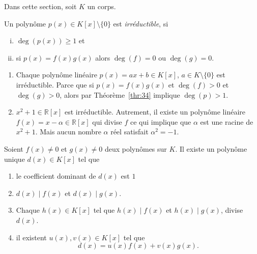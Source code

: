 Dans cette section, soit $K$ un corps.

\begin{definition}
  \label{def:53}
  Un polynôme $p(x) ∈ K[x] \setminus \{0\}$ est \emph{irréductible}, si
  \begin{enumerate}[i)]
  \item $\deg(p(x)) ≥1$ et
  \item  si $p(x) = f(x) g(x)$ alors $\deg(f) = 0$ ou $\deg(g) = 0$. 
  \end{enumerate}
\end{definition}

\begin{example}
  \label{exe:46}
  \begin{enumerate}
  \item   Chaque polynôme linéaire $p(x) = ax + b ∈ K[x]$, $a ∈ K \setminus\{0\}$ est irréductible. Parce que si $p(x) = f(x) g(x)$ et $\deg(f)>0$ et $\deg(g)>0$, alors par Théorème~\ref{thr:34} implique $\deg(p) >1$.
  \item $x^2 +1 ∈ℝ[x]$ est irréductible. Autrement, il existe un polynôme linéaire $f(x) =  x - α ∈ ℝ[x]$ qui divise $f$ ce qui implique que $α$ est une racine de $x^2 +1$. Mais aucun nombre $α$ réel satisfait $α^2 = -1$.
  \end{enumerate}
\end{example}

\begin{theorem}
  Soient $f(x) ≠0$ et $g(x)≠0$ deux polynômes sur $K$. Il existe un polynôme unique $d(x)∈K[x]$ tel que
  \begin{enumerate}
  \item le coefficient dominant de $d(x)$ est $1$
  \item $d(x) \mid f(x)$ et $d(x) \mid g(x)$.
  \item Chaque $h(x) ∈ K[x]$ tel que $h(x) \mid f(x)$  et $h(x) \mid g(x)$, divise $d(x)$.
  \item il existent $u(x), v(x) ∈K[x]$ tel que
    \begin{displaymath}
      d(x) = u(x) f(x) + v(x) g(x). 
    \end{displaymath}
  \end{enumerate}
\end{theorem}


